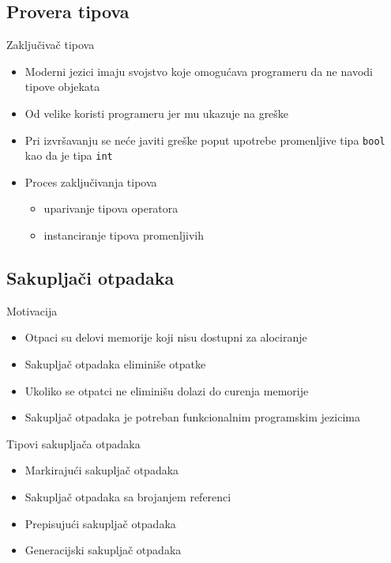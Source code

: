 \documentclass[xcolor={dvipsnames}, 11pt]{beamer}
\begin{document}
\subsection{Provera tipova}

\begin{frame}{Zaključivač tipova}
	
	\begin{itemize}
		\item Moderni jezici imaju svojstvo koje omogućava programeru da ne navodi tipove objekata
		\item Od velike koristi programeru jer mu ukazuje na greške
		\item Pri izvršavanju se neće javiti greške poput upotrebe promenljive tipa \texttt{bool} kao da je tipa \texttt{int}
		\item Proces zaključivanja tipova
		\begin{itemize}
			\item uparivanje tipova operatora
			\item instanciranje tipova promenljivih
		\end{itemize}
	\end{itemize}
	
\end{frame}


\subsection{Sakupljači otpadaka}
\begin{frame}{Motivacija}
	\begin{itemize}
		\item Otpaci su delovi memorije koji nisu dostupni za alociranje
		\item Sakupljač otpadaka eliminiše otpatke
		\item Ukoliko se otpatci ne eliminišu dolazi do curenja memorije
		\item Sakupljač otpadaka je potreban funkcionalnim programskim jezicima
	\end{itemize}
\end{frame}

\begin{frame}{Tipovi sakupljača otpadaka}
	\begin{itemize}
		\item Markirajući sakupljač otpadaka
		\item Sakupljač otpadaka sa brojanjem referenci
		\item Prepisujući sakupljač otpadaka
		\item Generacijski sakupljač otpadaka
	\end{itemize}
\end{frame}
\end{document}
